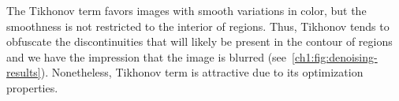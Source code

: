The Tikhonov term favors images with smooth variations in color, but the smoothness is not restricted to the interior of regions. Thus, Tikhonov tends to obfuscate the discontinuities that will likely be present in the contour of regions and we have the impression that the image is blurred (see~\cref{ch1:fig:denoising-results}). Nonetheless, Tikhonov term is attractive due to its optimization properties.

\begin{figure}
\center
{}\hspace{0.2em} \setcounter{subfigure}{0}
\end{figure}
